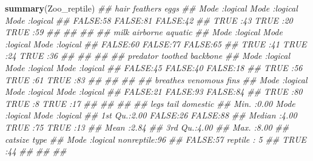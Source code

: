\documentclass[
  notitlepage]{book}
\newenvironment{Shaded}{\begin{snugshade}}{\end{snugshade}}
\newcommand{\CommentTok}[1]{\textcolor[rgb]{0.56,0.35,0.01}{\textit{#1}}}
\newcommand{\KeywordTok}[1]{\textcolor[rgb]{0.13,0.29,0.53}{\textbf{#1}}}
\newcommand{\NormalTok}[1]{#1}
\begin{document}
\begin{Shaded}
\begin{Highlighting}[]
\KeywordTok{summary}\NormalTok{(Zoo\_reptile)}
\CommentTok{\#\#     hair          feathers          eggs        }
\CommentTok{\#\#  Mode :logical   Mode :logical   Mode :logical  }
\CommentTok{\#\#  FALSE:58        FALSE:81        FALSE:42       }
\CommentTok{\#\#  TRUE :43        TRUE :20        TRUE :59       }
\CommentTok{\#\#                                                 }
\CommentTok{\#\#                                                 }
\CommentTok{\#\#                                                 }
\CommentTok{\#\#     milk          airborne        aquatic       }
\CommentTok{\#\#  Mode :logical   Mode :logical   Mode :logical  }
\CommentTok{\#\#  FALSE:60        FALSE:77        FALSE:65       }
\CommentTok{\#\#  TRUE :41        TRUE :24        TRUE :36       }
\CommentTok{\#\#                                                 }
\CommentTok{\#\#                                                 }
\CommentTok{\#\#                                                 }
\CommentTok{\#\#   predator        toothed         backbone      }
\CommentTok{\#\#  Mode :logical   Mode :logical   Mode :logical  }
\CommentTok{\#\#  FALSE:45        FALSE:40        FALSE:18       }
\CommentTok{\#\#  TRUE :56        TRUE :61        TRUE :83       }
\CommentTok{\#\#                                                 }
\CommentTok{\#\#                                                 }
\CommentTok{\#\#                                                 }
\CommentTok{\#\#   breathes        venomous          fins        }
\CommentTok{\#\#  Mode :logical   Mode :logical   Mode :logical  }
\CommentTok{\#\#  FALSE:21        FALSE:93        FALSE:84       }
\CommentTok{\#\#  TRUE :80        TRUE :8         TRUE :17       }
\CommentTok{\#\#                                                 }
\CommentTok{\#\#                                                 }
\CommentTok{\#\#                                                 }
\CommentTok{\#\#       legs         tail          domestic      }
\CommentTok{\#\#  Min.   :0.00   Mode :logical   Mode :logical  }
\CommentTok{\#\#  1st Qu.:2.00   FALSE:26        FALSE:88       }
\CommentTok{\#\#  Median :4.00   TRUE :75        TRUE :13       }
\CommentTok{\#\#  Mean   :2.84                                  }
\CommentTok{\#\#  3rd Qu.:4.00                                  }
\CommentTok{\#\#  Max.   :8.00                                  }
\CommentTok{\#\#   catsize                type   }
\CommentTok{\#\#  Mode :logical   nonreptile:96  }
\CommentTok{\#\#  FALSE:57        reptile   : 5  }
\CommentTok{\#\#  TRUE :44                       }
\CommentTok{\#\#                                 }
\CommentTok{\#\#                                 }
\CommentTok{\#\# }
\end{Highlighting}
\end{Shaded}
\end{document}
